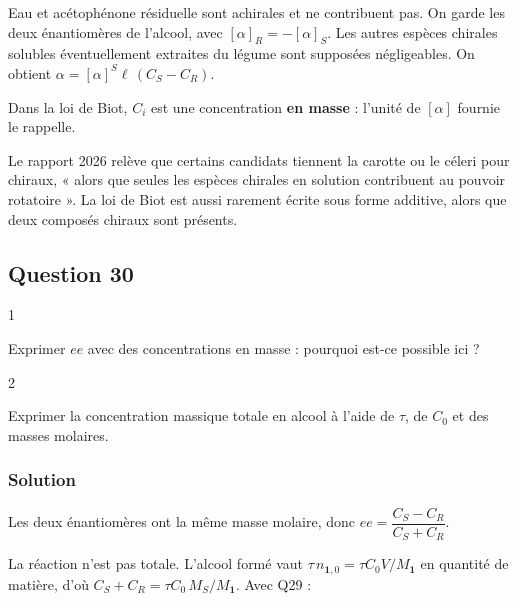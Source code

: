 \documentclass[11pt,a4paper]{article}
\begin{document}
Eau et acétophénone résiduelle sont achirales et ne contribuent pas. On garde les deux énantiomères de l'alcool, avec \([\alpha]_R = -[\alpha]_S\). Les autres espèces chirales solubles éventuellement extraites du légume sont supposées négligeables. On obtient \(\alpha = [\alpha]^S\ell\,(C_S - C_R)\).

\begin{piege}

Dans la loi de Biot, \(C_i\) est une concentration \textbf{en masse} : l'unité de \([\alpha]\) fournie le rappelle.

\end{piege}

\begin{jury}

Le rapport 2026 relève que certains candidats tiennent la carotte ou le céleri pour chiraux, « alors que seules les espèces chirales en solution contribuent au pouvoir rotatoire ». La loi de Biot est aussi rarement écrite sous forme additive, alors que deux composés chiraux sont présents.

\end{jury}

\hypertarget{question-30}{%
\subsection{Question 30}\label{question-30}}

\begin{indication}{1}

Exprimer \(ee\) avec des concentrations en masse : pourquoi est-ce possible ici ?

\end{indication}

\begin{indication}{2}

Exprimer la concentration massique totale en alcool à l'aide de \(\tau\), de \(C_0\) et des masses molaires.

\end{indication}

\hypertarget{solution-29}{%
\subsubsection{Solution}\label{solution-29}}

Les deux énantiomères ont la même masse molaire, donc \(ee = \dfrac{C_S - C_R}{C_S + C_R}\).

La réaction n'est pas totale. L'alcool formé vaut \(\tau\,n_{\mathbf 1,0} = \tau C_0V/M_{\mathbf 1}\) en quantité de matière, d'où \(C_S + C_R = \tau C_0\,M_S/M_{\mathbf 1}\). Avec Q29 :
\end{document}
